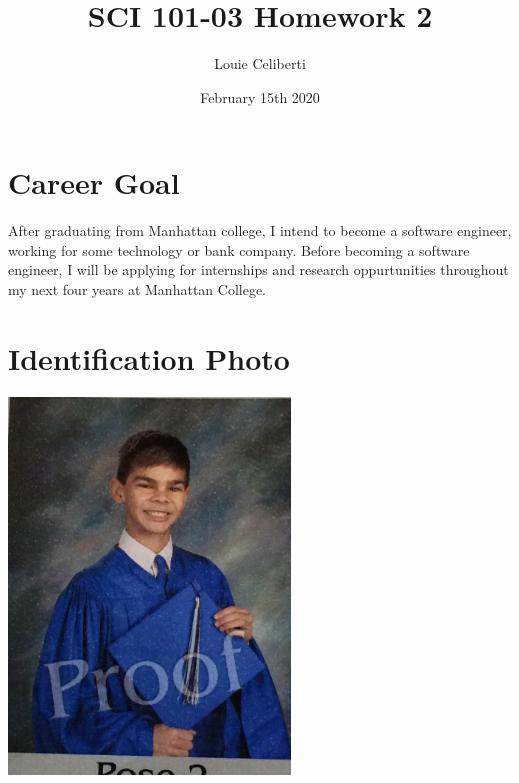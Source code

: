 \documentclass[a4paper,12pt]{article}
\begin{document}
\title{SCI 101-03 Homework 2}
     \author{Louie Celiberti}
     \date{February 15th 2020}
     \maketitle
     
\section{Career Goal}
After graduating from Manhattan college, I intend to become a software engineer, working for some technology or bank company. Before becoming a software engineer, I will be applying for internships and research oppurtunities throughout my next four years at Manhattan College.

\section{Identification Photo}
\begin{center}
\includegraphics[width= 75mm]{graduation.png}
\end{center}
\end{document}
